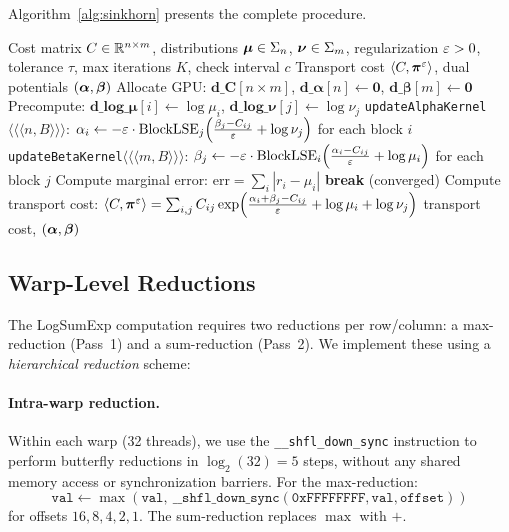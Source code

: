 Algorithm~\ref{alg:sinkhorn} presents the complete procedure.

\begin{algorithm}[t]
\caption{Log-Domain Sinkhorn with CUDA Parallelization}
\label{alg:sinkhorn}
\begin{algorithmic}[1]
\REQUIRE Cost matrix $C \in \mathbb{R}^{n \times m}$, distributions $\bm{\mu} \in \Sigma_n$, $\bm{\nu} \in \Sigma_m$, regularization $\varepsilon > 0$, tolerance $\tau$, max iterations $K$, check interval $c$
\ENSURE Transport cost $\langle C, \bm{\pi}^\varepsilon \rangle$, dual potentials $(\bm{\alpha}, \bm{\beta})$
\STATE Allocate GPU: $\mathbf{d\_C}[n \times m]$, $\mathbf{d\_\alpha}[n] \gets \mathbf{0}$, $\mathbf{d\_\beta}[m] \gets \mathbf{0}$
\STATE Precompute: $\mathbf{d\_log\_\mu}[i] \gets \log \mu_i$, $\mathbf{d\_log\_\nu}[j] \gets \log \nu_j$
    \STATE \texttt{updateAlphaKernel}$\langle\langle\langle n, B \rangle\rangle\rangle$: 
    \STATE \quad $\alpha_i \gets -\varepsilon \cdot \mathrm{BlockLSE}_{j}\!\left(\frac{\beta_j - C_{ij}}{\varepsilon} + \log \nu_j\right)$ for each block $i$
    \STATE \texttt{updateBetaKernel}$\langle\langle\langle m, B \rangle\rangle\rangle$: 
    \STATE \quad $\beta_j \gets -\varepsilon \cdot \mathrm{BlockLSE}_{i}\!\left(\frac{\alpha_i - C_{ij}}{\varepsilon} + \log \mu_i\right)$ for each block $j$
        \STATE Compute marginal error: $\mathrm{err} = \sum_i |r_i - \mu_i|$ 
            \STATE \textbf{break} (converged)
        \ENDIF
    \ENDIF
\ENDFOR
\STATE Compute transport cost: $\langle C, \bm{\pi}^\varepsilon \rangle = \sum_{i,j} C_{ij} \exp\!\left(\frac{\alpha_i + \beta_j - C_{ij}}{\varepsilon} + \log \mu_i + \log \nu_j\right)$
\RETURN transport cost, $(\bm{\alpha}, \bm{\beta})$
\end{algorithmic}
\end{algorithm}

\subsection{Warp-Level Reductions}
\label{sec:warp_reductions}

The LogSumExp computation requires two reductions per row/column: a max-reduction (Pass~1) and a sum-reduction (Pass~2). We implement these using a \emph{hierarchical reduction} scheme:

\paragraph{Intra-warp reduction.} Within each warp (32 threads), we use the \texttt{\_\_shfl\_down\_sync} instruction to perform butterfly reductions in $\log_2(32) = 5$ steps, without any shared memory access or synchronization barriers. For the max-reduction:
\begin{equation}
    \texttt{val} \gets \max(\texttt{val},\ \texttt{\_\_shfl\_down\_sync}(\texttt{0xFFFFFFFF}, \texttt{val}, \texttt{offset}))
\end{equation}
for offsets $16, 8, 4, 2, 1$. The sum-reduction replaces $\max$ with $+$.

